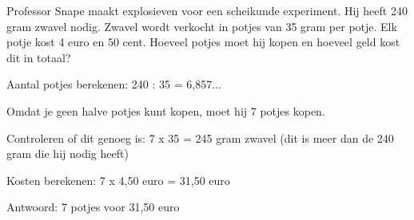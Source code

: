 \begin{opgave}
Professor Snape maakt explosieven voor een scheikunde experiment. Hij heeft 
240 gram zwavel nodig. Zwavel wordt verkocht in potjes van 35 gram per potje. 
Elk potje kost 4 euro en 50 cent. Hoeveel potjes moet hij kopen en hoeveel 
geld kost dit in totaal?
\end{opgave}

\begin{oplossing}
Aantal potjes berekenen:
240 : 35 = 6,857...

Omdat je geen halve potjes kunt kopen, moet hij 7 potjes kopen.

Controleren of dit genoeg is:
7 x 35 = 245 gram zwavel (dit is meer dan de 240 gram die hij nodig heeft)

Kosten berekenen:
7 x 4,50 euro = 31,50 euro

Antwoord: 7 potjes voor 31,50 euro
\end{oplossing}